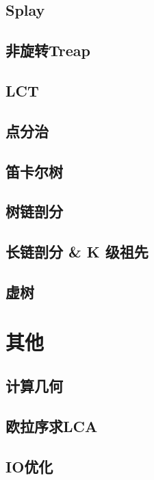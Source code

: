 \documentclass[a4paper,12pt]{article}
\begin{document}
\subsection{Splay}

\subsection{非旋转Treap}

\subsection{LCT}

\subsection{点分治}

\subsection{笛卡尔树}

\subsection{树链剖分}

\subsection{长链剖分 \& K 级祖先}

\subsection{虚树}


\section{其他}

\subsection{计算几何}

\subsection{欧拉序求LCA}

\subsection{IO优化}



\label{LastPage}
\end{document}
